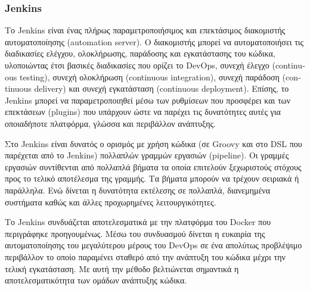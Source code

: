 \subsubsection{Jenkins} \label{subsection:4-2-1-3-jenkins}


Το Jenkins είναι ένας πλήρως παραμετροποιήσιμος και επεκτάσιμος διακομιστής αυτοματοποίησης (\textenglish{automation server}). Ο διακομιστής μπορεί να αυτοματοποιήσει τις διαδικασίες ελέγχου, ολοκλήρωσης, παράδοσης και εγκατάστασης του κώδικα, υλοποιώντας έτσι βασικές διαδικασίες που ορίζει το DevOps, συνεχή έλεγχο (\textenglish{continuous testing}), συνεχή ολοκλήρωση (\textenglish{continuous integration}), συνεχή παράδοση (\textenglish{continuous delivery}) και συνεχή εγκατάσταση (\textenglish{continuous deployment}). Επίσης, το Jenkins μπορεί να παραμετροποιηθεί μέσω των ρυθμίσεων που προσφέρει και των επεκτάσεων (plugins) που υπάρχουν ώστε να παρέχει τις δυνατότητες αυτές για οποιαδήποτε πλατφόρμα, γλώσσα και περιβάλλον ανάπτυξης.

Στο Jenkins είναι δυνατός ο ορισμός με χρήση κώδικα (σε Groovy και στο DSL που παρέχεται από το Jenkins) πολλαπλών γραμμών εργασιών (pipeline). Οι γραμμές εργασιών συντίθενται από πολλαπλά βήματα τα οποία επιτελούν ξεχωριστούς στόχους προς το τελικό αποτέλεσμα της γραμμής. Τα βήματα μπορούν να τρέχουν σειριακά ή παράλληλα. Ενώ δίνεται η δυνατότητα εκτέλεσης σε πολλαπλά, διανεμημένα συστήματα καθώς και άλλες προχωρημένες λειτουργικότητες.

Το Jenkins συνδυάζεται αποτελεσματικά με την πλατφόρμα του Docker που περιγράφηκε προηγουμένως. Μέσω του συνδυασμού δίνεται η ευκαιρία της αυτοματοποίησης του μεγαλύτερου μέρους του DevOps σε ένα απολύτως προβλέψιμο περιβάλλον το οποίο παραμένει σταθερό από την ανάπτυξη του κώδικα μέχρι την τελική εγκατάσταση. Με αυτή την μέθοδο βελτιώνεται σημαντικά η αποτελεσματικότητα των ομάδων ανάπτυξης κώδικα.

